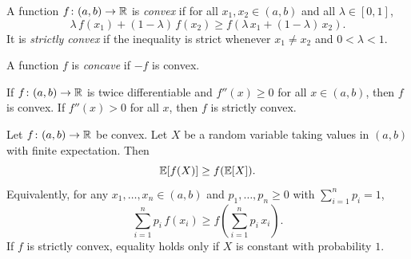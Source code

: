 \documentclass[a4paper]{article}
\begin{document}
\begin{defi}
  A function $f\colon (a, b) \to \mathbb{R}$ is \emph{convex} if for all $x_1, x_2\in (a, b)$ and all $\lambda \in [0, 1]$,
  \[
    \lambda\, f(x_1) + (1 - \lambda)\, f(x_2) \geq f(\lambda\, x_1 + (1 - \lambda)\, x_2).
  \]
  It is \emph{strictly convex} if the inequality is strict whenever $x_1 \neq x_2$ and $0 < \lambda < 1$.
  \begin{center}
  \end{center}
  A function $f$ is \emph{concave} if $-f$ is convex.
\end{defi}

\begin{prop}
  If $f\colon (a, b) \to \mathbb{R}$ is twice differentiable and $f''(x) \geq 0$ for all $x\in (a, b)$, then $f$ is convex. If $f''(x) > 0$ for all $x$, then $f$ is strictly convex.
\end{prop}

\begin{thm}
  Let $f\colon (a, b) \to \mathbb{R}$ be convex. Let $X$ be a random variable taking values in $(a,b)$ with finite expectation. Then
  \[
    \mathbb{E}[f(X)] \geq f(\mathbb{E}[X]).
  \]
  Equivalently, for any $x_1, \dotsc, x_n \in (a, b)$ and $p_1, \dotsc, p_n \geq 0$ with $\sum_{i=1}^{n} p_i = 1$,
  \[
    \sum_{i = 1}^n p_i\, f(x_i) \geq f\left(\sum_{i = 1}^n p_i\, x_i\right).
  \]
  If $f$ is strictly convex, equality holds only if $X$ is constant with probability $1$.
\end{thm}
\end{document}
